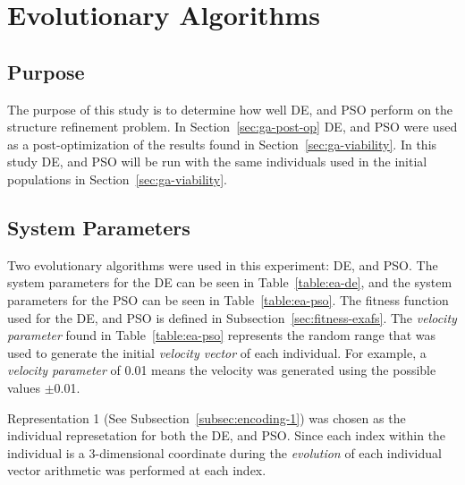 \section{Evolutionary Algorithms}

\subsection{Purpose}

The purpose of this study is to determine how well DE, and PSO perform on the structure refinement problem. In Section~\ref{sec:ga-post-op} DE, and PSO were used as a post-optimization of the results found in Section~\ref{sec:ga-viability}. In this study DE, and PSO will be run with the same individuals used in the initial populations in Section~\ref{sec:ga-viability}.

\subsection{System Parameters}

Two evolutionary algorithms were used in this experiment: DE, and PSO. The system parameters for the DE can be seen in Table~\ref{table:ea-de}, and the system parameters for the PSO can be seen in Table~\ref{table:ea-pso}. The fitness function used for the DE, and PSO is defined in Subsection~\ref{sec:fitness-exafs}. The \textit{velocity parameter} found in Table~\ref{table:ea-pso} represents the random range that was used to generate the initial \textit{velocity vector} of each individual. For example, a \textit{velocity parameter} of 0.01 means the velocity was generated using the possible values $\pm$0.01.

Representation 1 (See Subsection~\ref{subsec:encoding-1}) was chosen as the individual represetation for both the DE, and PSO. Since each index within the individual is a 3-dimensional coordinate during the \textit{evolution} of each individual vector arithmetic was performed at each index.


